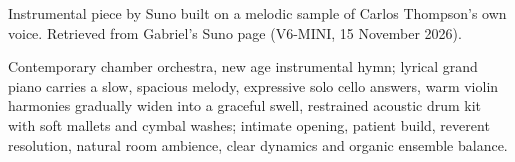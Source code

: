 
\begin{notes}
Instrumental piece by Suno built on a melodic sample of Carlos Thompson's own voice. Retrieved from Gabriel's Suno page (V6-MINI, 15 November 2026).
\end{notes}
\begin{style}
Contemporary chamber orchestra, new age instrumental hymn; lyrical grand piano carries a slow, spacious melody, expressive solo cello answers, warm violin harmonies gradually widen into a graceful swell, restrained acoustic drum kit with soft mallets and cymbal washes; intimate opening, patient build, reverent resolution, natural room ambience, clear dynamics and organic ensemble balance.
\end{style}
\begin{lyrics}
\end{lyrics}

